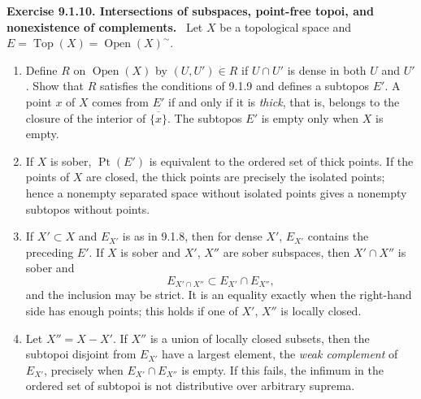 \documentclass[11pt]{article}
\newcommand{\Top}{\operatorname{Top}}
\newcommand{\Ouv}{\operatorname{Open}}
\newcommand{\Ppoint}{\operatorname{Pt}}
\newenvironment{remarktext}[1]{\par\medskip\noindent\textbf{#1.}\ }{\par\medskip}
\begin{document}
\begin{remarktext}{Exercise 9.1.10. Intersections of subspaces, point-free topoi, and nonexistence of complements}
Let \(X\) be a topological space and \(E=\Top(X)=\Ouv(X)^\sim\).
\begin{enumerate}[label=\alph*)]
\item Define \(R\) on \(\Ouv(X)\) by \((U,U')\in R\) if \(U\cap U'\) is dense in both \(U\) and \(U'\). Show that \(R\) satisfies the conditions of 9.1.9 and defines a subtopos \(E'\). A point \(x\) of \(X\) comes from \(E'\) if and only if it is \emph{thick}, that is, belongs to the closure of the interior of \(\overline{\{x\}}\). The subtopos \(E'\) is empty only when \(X\) is empty.
\item If \(X\) is sober, \(\Ppoint(E')\) is equivalent to the ordered set of thick points. If the points of \(X\) are closed, the thick points are precisely the isolated points; hence a nonempty separated space without isolated points gives a nonempty subtopos without points.
\item If \(X'\subset X\) and \(E_{X'}\) is as in 9.1.8, then for dense \(X'\), \(E_{X'}\) contains the preceding \(E'\). If \(X\) is sober and \(X'\), \(X''\) are sober subspaces, then \(X'\cap X''\) is sober and
\[
E_{X'\cap X''}\subset E_{X'}\cap E_{X''},
\]
and the inclusion may be strict. It is an equality exactly when the right-hand side has enough points; this holds if one of \(X'\), \(X''\) is locally closed.
\item Let \(X''=X-X'\). If \(X''\) is a union of locally closed subsets, then the subtopoi disjoint from \(E_{X'}\) have a largest element, the \emph{weak complement} of \(E_{X'}\), precisely when \(E_{X'}\cap E_{X''}\) is empty. If this fails, the infimum in the ordered set of subtopoi is not distributive over arbitrary suprema.
\end{enumerate}
\end{remarktext}
\end{document}
